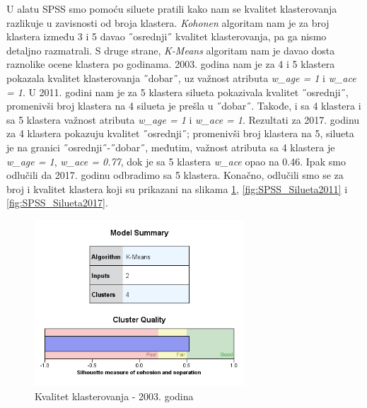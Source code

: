 \documentclass[a4paper]{article}
\begin{document}
U alatu SPSS smo pomoću siluete pratili kako nam se kvalitet klasterovanja razlikuje u zavisnosti od broja klastera. 
\textit{Kohonen} algoritam nam je za broj klastera između 3 i 5 davao ˝osrednji˝ kvalitet klasterovanja, pa ga nismo detaljno razmatrali. S druge strane, \textit{K-Means} algoritam nam je davao dosta raznolike ocene klastera po godinama. 2003. godina nam je za 4 i 5 klastera pokazala kvalitet klasterovanja  ˝dobar˝, uz važnost atributa \textit{w\_age = 1} i \textit{w\_ace = 1}. U 2011. godini nam je za 5 klastera silueta pokazivala kvalitet ˝osrednji˝, promenivši broj klastera na 4 silueta je prešla u ˝dobar˝. Takođe, i sa 4 klastera i sa 5 klastera važnost atributa \textit{w\_age = 1} i \textit{w\_ace = 1}. Rezultati za 2017. godinu za 4 klastera pokazuju kvalitet ˝osrednji˝; promenivši broj klastera na 5, silueta je na granici ˝osrednji˝-˝dobar˝, međutim, važnost atributa sa 4 klastera je \textit{w\_age = 1}, \textit{w\_ace = 0.77}, dok je sa 5 klastera \textit{w\_ace} opao na 0.46. Ipak smo odlučili da 2017. godinu odbradimo sa 5 klastera. Konačno, odlučili smo se za broj i kvalitet klastera koji su prikazani na slikama \ref{fig:SPSS_Silueta2003}, \ref{fig:SPSS_Silueta2011} i \ref{fig:SPSS_Silueta2017}.

\vspace{2cm}
\begin{figure}[H]
	\begin{center}
		\includegraphics[width=0.7\textwidth]{Klasterovanje/Model_KMeans2003_Silhouette.png}
	\end{center}
	\caption{Kvalitet klasterovanja - 2003. godina}
	\label{fig:SPSS_Silueta2003}
\end{figure}
\end{document}
